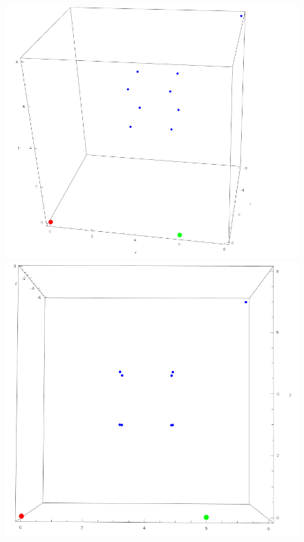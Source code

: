 \begin{figure}[!htb]
	\includegraphics[width=\linewidth]{images/MinimalBeispiel_reconstructed.png}
	\label{fig:awesome_image1}
	\endminipage\hfill
	\includegraphics[width=\linewidth]{images/MinimalBeispiel_reconstructed_3.png}
	\label{fig:awesome_image2}
	\endminipage\hfill
\end{figure}

